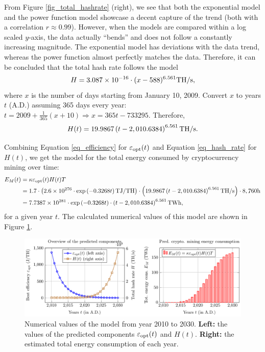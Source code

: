 \documentclass[12pt]{article}
\begin{document}
From Figure \ref{fig_total_hashrate} (right), we see that both the exponential model and the power function model showcase a decent capture of the trend (both with a correlation $r \approx 0.99$). However, when the models are compared within a log scaled $y$-axis, the data actually ``bends'' and does not follow a constantly increasing magnitude. The exponential model has deviations with the data trend, whereas the power function almost perfectly matches the data. Therefore, it can be concluded that the total hash rate follows the model
\begin{equation}
	H = 3.087 \times 10^{-16} \cdot (x - 588)^{6.561} \rm TH/s,
\end{equation}
where $x$ is the number of days starting from January 10, 2009. Convert $x$ to years $t$ (A.D.) assuming 365 days every year: $t = 2009 + \frac{1}{365}(x + 10) \Rightarrow x = 365 t - 733295$. Therefore,
\begin{equation}
	H(t) = 19.9867 \left( t - 2,010.6384 \right)^{6.561} \rm TH/s.
	\label{eq_hash_rate}
\end{equation}

Combining Equation \ref{eq_efficiency} for $\varepsilon_{\rm opt} (t)$ and Equation \ref{eq_hash_rate} for $H(t)$, we get the model for the total energy consumed by cryptocurrency mining over time:
\begin{equation}
	\begin{aligned}
		E_M (t) &= \kappa \varepsilon_{\rm opt} (t) H(t) T \\
		&= 1.7 \cdot \left(
			2.6 \times 10^{276} \cdot \exp \left(-0.3268t\right) {\rm TJ/TH}
		\right) \cdot \left(
			19.9867 \left( t - 2,010.6384 \right)^{6.561} {\rm TH/s}
		\right) \cdot 8,760 {\rm h} \\
		&= 7.7387 \times 10^{281} \cdot \exp \left(-0.3268t\right) \cdot \left( t - 2,010.6384 \right)^{6.561} {\rm TWh},
	\end{aligned}
\end{equation}
for a given year $t$. The calculated numerical values of this model are shown in Figure \ref{fig_crypto_energy_pred}.

\begin{figure}[!t]
	\centering
	\includegraphics{figures/trends/crypto_energy.pdf}
	\caption{Numerical values of the model from year 2010 to 2030. \textbf{Left:} the values of the predicted components $\varepsilon_{\rm opt}(t)$ and $H(t)$. \textbf{Right:} the estimated total energy consumption of each year.}
	\label{fig_crypto_energy_pred}
\end{figure}
\end{document}
